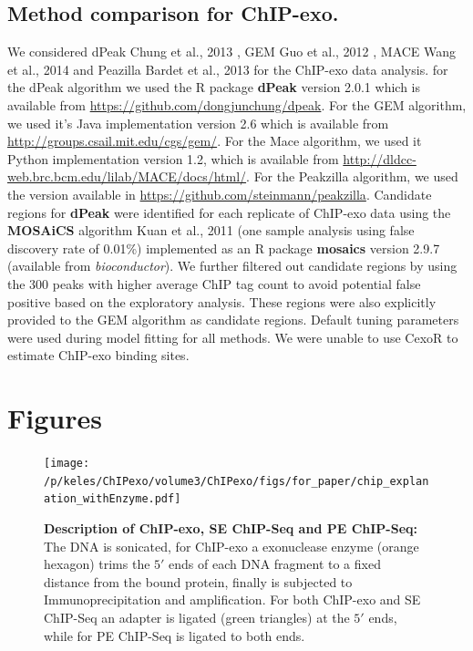 \documentclass{bmcart}\usepackage[]{graphicx}\usepackage[]{color}
\begin{document}
\subsection*{Method comparison for ChIP-exo.}

We considered dPeak Chung et al., 2013 \cite{dpeak}, GEM Guo et al.,
2012 \cite{gem}, MACE Wang et al., 2014 \cite{mace} and Peazilla
Bardet et al., 2013 \cite{peakzilla} for the ChIP-exo data
analysis. for the dPeak algorithm we used the R package \textbf{dPeak}
version 2.0.1 which is available from
\url{https://github.com/dongjunchung/dpeak}. For the GEM algorithm, we
used it's Java implementation version 2.6 which is available from
\url{http://groups.csail.mit.edu/cgs/gem/}. For the Mace algorithm, we
used it Python implementation version 1.2, which is available from
\url{http://dldcc-web.brc.bcm.edu/lilab/MACE/docs/html/}. For the
Peakzilla algorithm, we used the version available in
\url{https://github.com/steinmann/peakzilla}. Candidate regions for
\textbf{dPeak} were identified for each replicate of ChIP-exo data
using the \textbf{MOSAiCS} algorithm Kuan et al., 2011 \cite{mosaics}
(one sample analysis using false discovery rate of 0.01\%)
implemented as an R package \textbf{mosaics} version 2.9.7 (available
from \emph{bioconductor}). We further filtered out candidate regions
by using the 300 peaks with higher average ChIP tag count to
avoid potential false positive based on the exploratory
analysis. These regions were also explicitly provided to the GEM
algorithm as candidate regions. Default tuning parameters were used
during model fitting for all methods. We were unable to use CexoR
\cite{cexor} to estimate ChIP-exo binding sites.


\nocite{exo_gb}
\nocite{maplot1}
\nocite{maplot2}
\nocite{chipbeyond}



\newpage

\section{Figures}

\begin{figure}[h!]
  \centering
  \texttt{[image: /p/keles/ChIPexo/volume3/ChIPexo/figs/for\_paper/chip\_explanation\_withEnzyme.pdf]}
  \caption{\textbf{Description of ChIP-exo, SE ChIP-Seq and PE
      ChIP-Seq:} The DNA is sonicated, for ChIP-exo a exonuclease
    enzyme (orange hexagon) trims the $5\prime$ ends of each DNA
    fragment to a fixed distance from the bound protein, finally is
    subjected to Immunoprecipitation and amplification. For both
    ChIP-exo and SE ChIP-Seq an adapter is ligated (green triangles)
    at the $5\prime$ ends, while for PE ChIP-Seq is ligated to both
    ends.}
  \label{fig:chip_diagram}
\end{figure}
\newpage
\end{document}
